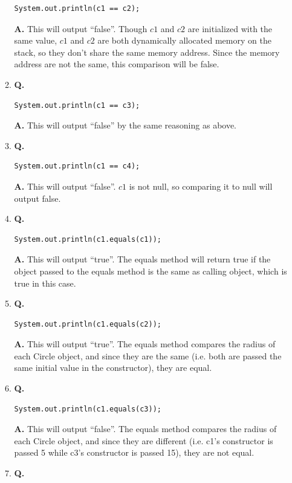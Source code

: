 \documentclass[12pt]{article}
\begin{document}
\begin{enumerate}
\begin{enumerate}[label=\Alph*]
\begin{lstlisting}
System.out.println(c1 == c2);
  \end{lstlisting}
  \textbf{A.} This will output ``false''. Though $c1$ and $c2$ are initialized with the same value, $c1$ and $c2$ are both dynamically allocated memory on the stack, so they don't share the same memory address. Since the memory address are not the same, this comparison will be false.
  \\
  \item \textbf{Q.}
  \begin{lstlisting}
System.out.println(c1 == c3);
  \end{lstlisting}
  \textbf{A.} This will output ``false'' by the same reasoning as above.
  \\
  \item \textbf{Q.}
  \begin{lstlisting}
System.out.println(c1 == c4);
  \end{lstlisting}
  \textbf{A.} This will output ``false''. $c1$ is not null, so comparing it to null will output false.
  \\
  \item \textbf{Q.}
  \begin{lstlisting}
System.out.println(c1.equals(c1));
  \end{lstlisting}
  \textbf{A.} This will output ``true''. The equals method will return true if the object passed to the equals method is the same as calling object, which is true in this case.
  \\
  \item \textbf{Q.}
  \begin{lstlisting}
System.out.println(c1.equals(c2));
  \end{lstlisting}
  \textbf{A.} This will output ``true''. The equals method compares the radius of each Circle object, and since they are the same (i.e. both are passed the same initial value in the constructor), they are equal.
  \\
  \item \textbf{Q.}
  \begin{lstlisting}
System.out.println(c1.equals(c3));
  \end{lstlisting}
  \textbf{A.} This will output ``false''. The equals method compares the radius of each Circle object, and since they are different (i.e. c1's constructor is passed 5 while c3's constructor is passed 15), they are not equal.
  \\
  \item \textbf{Q.}
  \begin{lstlisting}

\end{lstlisting}
\end{enumerate}
\end{enumerate}
\end{document}
